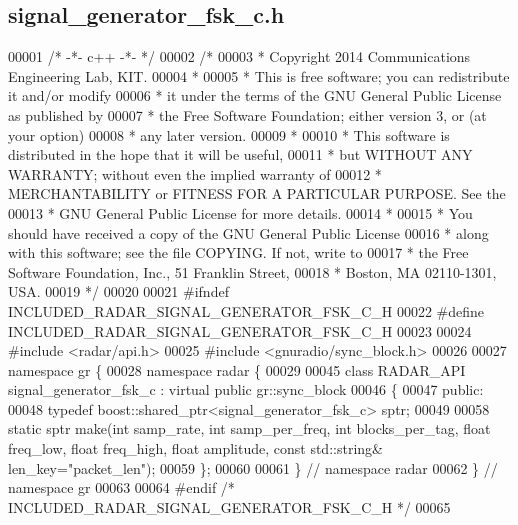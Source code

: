 \subsection{signal\+\_\+generator\+\_\+fsk\+\_\+c.\+h}
\label{signal__generator__fsk__c_8h_source}

\begin{DoxyCode}
00001 \textcolor{comment}{/* -*- c++ -*- */}
00002 \textcolor{comment}{/* }
00003 \textcolor{comment}{ * Copyright 2014 Communications Engineering Lab, KIT.}
00004 \textcolor{comment}{ * }
00005 \textcolor{comment}{ * This is free software; you can redistribute it and/or modify}
00006 \textcolor{comment}{ * it under the terms of the GNU General Public License as published by}
00007 \textcolor{comment}{ * the Free Software Foundation; either version 3, or (at your option)}
00008 \textcolor{comment}{ * any later version.}
00009 \textcolor{comment}{ * }
00010 \textcolor{comment}{ * This software is distributed in the hope that it will be useful,}
00011 \textcolor{comment}{ * but WITHOUT ANY WARRANTY; without even the implied warranty of}
00012 \textcolor{comment}{ * MERCHANTABILITY or FITNESS FOR A PARTICULAR PURPOSE.  See the}
00013 \textcolor{comment}{ * GNU General Public License for more details.}
00014 \textcolor{comment}{ * }
00015 \textcolor{comment}{ * You should have received a copy of the GNU General Public License}
00016 \textcolor{comment}{ * along with this software; see the file COPYING.  If not, write to}
00017 \textcolor{comment}{ * the Free Software Foundation, Inc., 51 Franklin Street,}
00018 \textcolor{comment}{ * Boston, MA 02110-1301, USA.}
00019 \textcolor{comment}{ */}
00020  
00021 \textcolor{preprocessor}{#ifndef INCLUDED\_RADAR\_SIGNAL\_GENERATOR\_FSK\_C\_H}
00022 \textcolor{preprocessor}{#define INCLUDED\_RADAR\_SIGNAL\_GENERATOR\_FSK\_C\_H}
00023 
00024 \textcolor{preprocessor}{#include <radar/api.h>}
00025 \textcolor{preprocessor}{#include <gnuradio/sync\_block.h>}
00026 
00027 \textcolor{keyword}{namespace }gr \{
00028   \textcolor{keyword}{namespace }radar \{
00029 
00045     \textcolor{keyword}{class }RADAR_API signal_generator_fsk_c : \textcolor{keyword}{virtual} \textcolor{keyword}{public} gr::sync\_block
00046     \{
00047      \textcolor{keyword}{public}:
00048       \textcolor{keyword}{typedef} boost::shared\_ptr<signal\_generator\_fsk\_c> sptr;
00049 
00058       \textcolor{keyword}{static} sptr make(\textcolor{keywordtype}{int} samp_rate, \textcolor{keywordtype}{int} samp_per_freq, \textcolor{keywordtype}{int} blocks_per_tag, \textcolor{keywordtype}{float} freq\_low, \textcolor{keywordtype}{float} 
      freq\_high, \textcolor{keywordtype}{float} amplitude, \textcolor{keyword}{const} std::string& len\_key=\textcolor{stringliteral}{"packet\_len"});
00059     \};
00060 
00061   \} \textcolor{comment}{// namespace radar}
00062 \} \textcolor{comment}{// namespace gr}
00063 
00064 \textcolor{preprocessor}{#endif }\textcolor{comment}{/* INCLUDED\_RADAR\_SIGNAL\_GENERATOR\_FSK\_C\_H */}\textcolor{preprocessor}{}
00065 
\end{DoxyCode}
